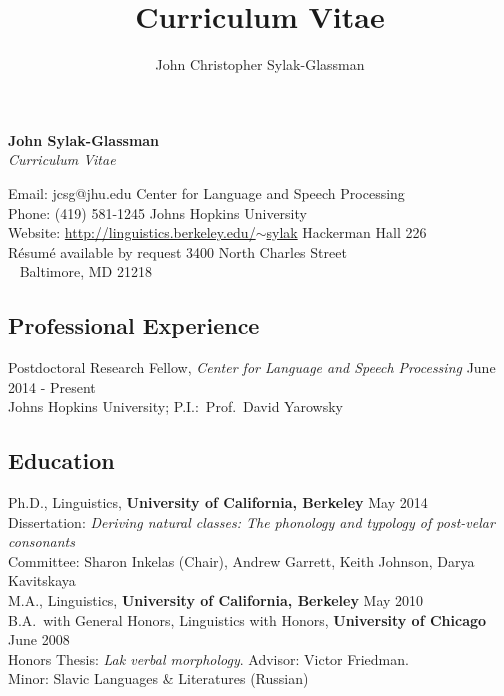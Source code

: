 \documentclass[11pt]{article}
\title{Curriculum Vitae}
\author{John Christopher Sylak-Glassman}
\renewcommand{\it}[1]{\textit{#1}}
\begin{document}
\thispagestyle{empty}
\begin{center}\noindent\textbf{\LARGE John Sylak-Glassman}\vspace{6pt} \\ \noindent\textit{\large Curriculum Vitae} %
\end{center} 
\noindent Email: jcsg@jhu.edu \hfill Center for Language and Speech Processing \\
Phone: (419) 581-1245 \hfill Johns Hopkins University \\
Website: \href{http://linguistics.berkeley.edu/~sylak/}{http://linguistics.berkeley.edu/$\sim$sylak} \hfill Hackerman Hall 226 \\
R\'esum\'e available by request \hfill 3400 North Charles Street \\
\mbox{ } \hfill Baltimore, MD 21218 %

\subsection*{Professional Experience}

\noindent Postdoctoral Research Fellow, \it{Center for Language and Speech Processing} \hfill June 2014 - Present \\
\noindent Johns Hopkins University; P.I.:~Prof.~David Yarowsky

\subsection*{Education}

\noindent Ph.D., Linguistics, \textbf{University of California, Berkeley} \hfill May 2014 \\
Dissertation: \it{Deriving natural classes: The phonology and typology of post-velar consonants} \\
Committee: Sharon Inkelas (Chair), Andrew Garrett, Keith Johnson, Darya Kavitskaya \vspace{-8pt} \\

\noindent M.A., Linguistics, \textbf{University of California, Berkeley} \hfill May 2010\vspace{-8pt} \\

\noindent B.A.~with General Honors, Linguistics with Honors, \textbf{University of Chicago} \hfill June 2008 \\
Honors Thesis: \it{Lak verbal morphology}. Advisor: Victor Friedman. \\
Minor: Slavic Languages \& Literatures (Russian)
\end{document}
